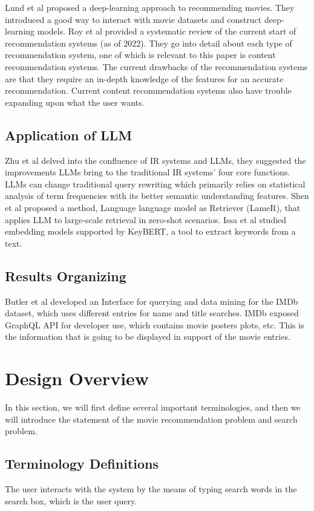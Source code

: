 \documentclass[journal]{IEEEtran}
\theoremstyle{mydefstyle}
\begin{document}
Lund et al\cite{RN7} proposed a deep-learning approach to recommending movies. They introduced a good way to interact with movie datasets and construct deep-learning models.
Roy et al\cite{RN17} provided a systematic review of the current start of recommendation systems (as of 2022). They go into detail about each type of recommendation system, one of which is relevant to this paper is content recommendation systems. The current drawbacks of the recommendation systems are that they require an in-depth knowledge of the features for an accurate recommendation. Current content recommendation systems also have trouble expanding upon what the user wants.

\subsection{Application of LLM}
Zhu et al\cite{LLM4IRSurvey} delved into the confluence of IR systems and LLMs, they suggested the improvements LLMs bring to the traditional IR systems’ four core functions. LLMs can change traditional query rewriting which primarily relies on statistical analysis of term frequencies with its better semantic understanding features. Shen et al\cite{RN11} proposed a method, Language language model as Retriever (LameR), that applies LLM to large-scale retrieval in zero-shot scenarios. Issa et al\cite{10295108} studied embedding models supported by KeyBERT, a tool to extract keywords from a text.

\subsection{Results Organizing}
Butler et al\cite{7494103} developed an Interface for querying and data mining for the IMDb dataset, which uses different entries for name and title searches. IMDb\cite{IMDb} exposed GraphQL API for developer use, which contains movie posters plots, etc. This is the information that is going to be displayed in support of the movie entries.

\section{Design Overview}
In this section, we will first define several important terminologies, and then we will introduce the statement of the movie recommendation problem and search problem.

\subsection{Terminology Definitions}
The user interacts with the system by the means of typing search words in the search box, which is the user query.
\end{document}
